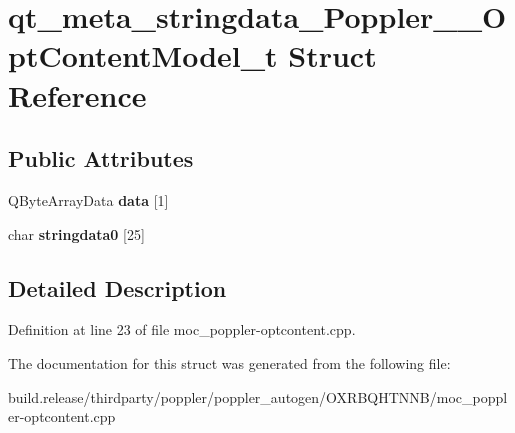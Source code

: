 \hypertarget{structqt__meta__stringdata___poppler_____opt_content_model__t}{}\section{qt\+\_\+meta\+\_\+stringdata\+\_\+\+Poppler\+\_\+\+\_\+\+Opt\+Content\+Model\+\_\+t Struct Reference}
\label{structqt__meta__stringdata___poppler_____opt_content_model__t}
\subsection*{Public Attributes}
\begin{DoxyCompactItemize}
\item 
\mbox{\label{structqt__meta__stringdata___poppler_____opt_content_model__t_a99f1dda4f142cf2d9484cdc24fd950cf}} 
Q\+Byte\+Array\+Data {\bfseries data} \mbox{[}1\mbox{]}
\item 
\mbox{\label{structqt__meta__stringdata___poppler_____opt_content_model__t_aee77541ee148b008cb600d6e30247dcd}} 
char {\bfseries stringdata0} \mbox{[}25\mbox{]}
\end{DoxyCompactItemize}


\subsection{Detailed Description}


Definition at line 23 of file moc\+\_\+poppler-\/optcontent.\+cpp.



The documentation for this struct was generated from the following file\+:\begin{DoxyCompactItemize}
\item 
build.\+release/thirdparty/poppler/poppler\+\_\+autogen/\+O\+X\+R\+B\+Q\+H\+T\+N\+N\+B/moc\+\_\+poppler-\/optcontent.\+cpp\end{DoxyCompactItemize}
